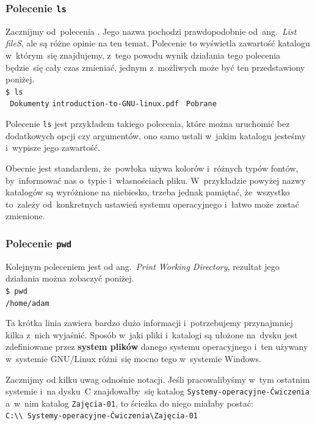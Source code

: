 \documentclass[10pt,t]{beamer}
\begin{document}
\begin{frame}
  \frametitle{Polecenie \texttt{ls}}


  Zacznijmy od~polecenia
  . Jego nazwa
  pochodzi prawdopodobnie od~ang.~\textit{List fileS}, ale są różne opinie
  na ten temat. Polecenie to wyświetla zawartość katalogu w~którym~się
  znajdujemy, z~tego powodu wynik działania tego polecenia będzie~się cały
  czas zmieniać, jednym z~możliwych może być ten przedstawiony poniżej. \\
  \texttt{\$ ls} \\
  \texttt{{\color{jAxisBlue} Dokumenty}} \quad
  \texttt{introduction-to-GNU-linux.pdf} \quad
  \texttt{{\color{jAxisBlue} Pobrane}}

  Polecenie \texttt{ls} jest przykładem takiego polecenia, które można
  uruchomić bez dodatkowych opcji czy argumentów, ono samo ustali w~jakim
  katalogu jesteśmy i~wypisze jego zawartość.

  Obecnie jest standardem, że~powłoka używa kolorów i~różnych typów fontów,
  by~informować nas o~typie i~własnościach pliku. W~przykładzie powyżej
  nazwy katalogów są wyróżnione na niebiesko, trzeba jednak pamiętać,
  że~wszystko to~zależy od~konkretnych ustawień systemu operacyjnego
  i~łatwo może zostać zmienione.

\end{frame}





\begin{frame}
  \frametitle{Polecenie \texttt{pwd}}


  Kolejnym poleceniem jest
  od ang.~\textit{Print Working Directory}, rezultat jego działania można
  zobaczyć poniżej. \\
  \texttt{\$ pwd} \\
  \texttt{/home/adam}

  Ta krótka linia zawiera bardzo dużo informacji i~potrzebujemy przynajmniej
  kilka z~nich wyjaśnić. Sposób w~jaki pliki i~katalogi są ułożone na~dysku
  jest zdefiniowane przez \textbf{system plików} danego systemu
  operacyjnego i~ten używany w~systemie GNU/Linux różni~się mocno tego
  w~systemie Windows.

  Zacznijmy od kilku uwag odnośnie notacji. Jeśli pracowalibyśmy w~tym
  ostatnim systemie i~na dysku~C znajdowałby~się
  katalog \texttt{Systemy-operacyjne-Ćwiczenia} a~w~nim katalog
  \texttt{Zajęcia-01}, to ścieżka do niego miałaby postać: \\
  \texttt{C:\textbackslash\textbackslash
    Systemy-operacyjne-Ćwiczenia\textbackslash Zajęcia-01} \\

\end{frame}
\end{document}
